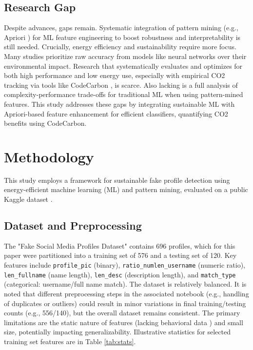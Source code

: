 \documentclass[conference]{IEEEtran}
\begin{document}
\subsection{Research Gap}
Despite advances, gaps remain. Systematic integration of pattern mining (e.g., Apriori \cite{b10}) for ML feature engineering to boost robustness and interpretability is still needed. Crucially, energy efficiency and sustainability require more focus. Many studies prioritize raw accuracy from models like neural networks \cite{b6, b4} over their environmental impact. Research that systematically evaluates and optimizes for both high performance and low energy use, especially with empirical CO2 tracking via tools like CodeCarbon \cite{b13}, is scarce. Also lacking is a full analysis of complexity-performance trade-offs for traditional ML \cite{b7, b3} when using pattern-mined features. This study addresses these gaps by integrating sustainable ML with Apriori-based feature enhancement for efficient classifiers, quantifying CO2 benefits using CodeCarbon.

\section{Methodology}
\label{sec:method}
This study employs a framework for sustainable fake profile detection using energy-efficient machine learning (ML) and pattern mining, evaluated on a public Kaggle dataset \cite{b5}.

\subsection{Dataset and Preprocessing}
The "Fake Social Media Profiles Dataset" \cite{b5} contains 696 profiles, which for this paper were partitioned into a training set of 576 and a testing set of 120. Key features include \texttt{profile\_pic} (binary), \texttt{ratio\_numlen\_username} (numeric ratio), \texttt{len\_fullname} (name length), \texttt{len\_desc} (description length), and \texttt{match\_type} (categorical: username/full name match). The dataset is relatively balanced. It is noted that different preprocessing steps in the associated notebook (e.g., handling of duplicates or outliers) could result in minor variations in final training/testing counts (e.g., 556/140), but the overall dataset remains consistent. The primary limitations are the static nature of features (lacking behavioral data \cite{b12}) and small size, potentially impacting generalizability. Illustrative statistics for selected training set features are in Table \ref{tab:stats}.
\end{document}
